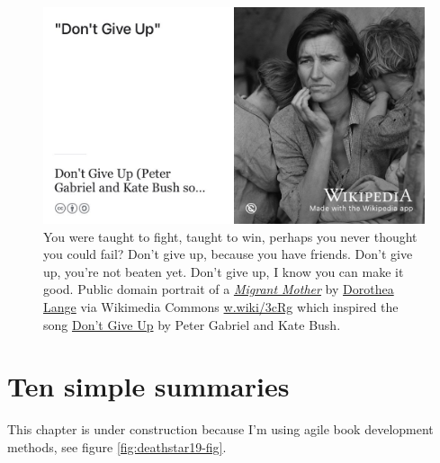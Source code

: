 \documentclass[
]{book}
\begin{document}
\begin{figure}

{\centering \includegraphics[width=1\linewidth]{images/dont-give-up-bush-gabriel} 

}

\caption{You were taught to fight, taught to win, perhaps you never thought you could fail? Don't give up, because you have friends. Don't give up, you're not beaten yet. Don't give up, I know you can make it good. \citep{dontgiveup} Public domain portrait of a \emph{\href{https://en.wikipedia.org/wiki/Migrant_Mother}{Migrant Mother}} by \href{https://en.wikipedia.org/wiki/Dorothea_Lange}{Dorothea Lange} via Wikimedia Commons \href{https://w.wiki/3cRg}{w.wiki/3cRg} which inspired the song \href{https://en.wikipedia.org/wiki/Don\textquotesingle{}t_Give_Up_(Peter_Gabriel_and_Kate_Bush_song)}{Don't Give Up} by Peter Gabriel and Kate Bush. \citep{dontgiveup}}\label{fig:katebush-fig}
\end{figure}



\hypertarget{tldr13}{%
\section{Ten simple summaries}\label{tldr13}}

This chapter is under construction because I'm using agile book development methods, see figure \ref{fig:deathstar19-fig}.
\end{document}
